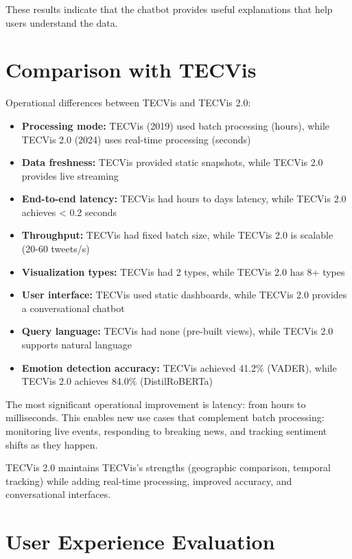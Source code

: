 These results indicate that the chatbot provides useful explanations that help users understand the data.


\section{Comparison with TECVis}

Operational differences between TECVis and TECVis 2.0:

\begin{itemize}
\item \textbf{Processing mode:} TECVis (2019) used batch processing (hours), while TECVis 2.0 (2024) uses real-time processing (seconds)
\item \textbf{Data freshness:} TECVis provided static snapshots, while TECVis 2.0 provides live streaming
\item \textbf{End-to-end latency:} TECVis had hours to days latency, while TECVis 2.0 achieves < 0.2 seconds
\item \textbf{Throughput:} TECVis had fixed batch size, while TECVis 2.0 is scalable (20-60 tweets/s)
\item \textbf{Visualization types:} TECVis had 2 types, while TECVis 2.0 has 8+ types
\item \textbf{User interface:} TECVis used static dashboards, while TECVis 2.0 provides a conversational chatbot
\item \textbf{Query language:} TECVis had none (pre-built views), while TECVis 2.0 supports natural language
\item \textbf{Emotion detection accuracy:} TECVis achieved 41.2\% (VADER), while TECVis 2.0 achieves 84.0\% (DistilRoBERTa)
\end{itemize}

The most significant operational improvement is latency: from hours to milliseconds. This enables new use cases that complement batch processing: monitoring live events, responding to breaking news, and tracking sentiment shifts as they happen.

TECVis 2.0 maintains TECVis's strengths (geographic comparison, temporal tracking) while adding real-time processing, improved accuracy, and conversational interfaces.


\section{User Experience Evaluation}

